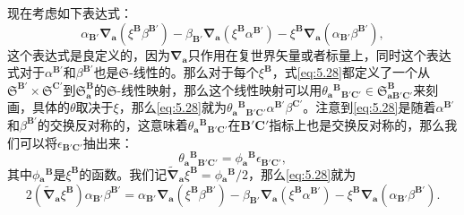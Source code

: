 现在考虑如下表达式：
\begin{equation}
	\alpha _{\boldsymbol{B} '}\boldsymbol{\nabla }_{\boldsymbol{a}} (\xi ^{\boldsymbol{B}} \beta ^{\boldsymbol{B} '} )-\beta _{\boldsymbol{B} '}\boldsymbol{\nabla }_{\boldsymbol{a}} (\xi ^{\boldsymbol{B}} \alpha ^{\boldsymbol{B} '} )-\xi ^{\boldsymbol{B}}\boldsymbol{\nabla }_{\boldsymbol{a}} (\alpha _{\boldsymbol{B} '} \beta ^{\boldsymbol{B} '} ),
	\label{eq:5.28}
\end{equation}
这个表达式是良定义的，因为$\boldsymbol{\nabla }_{\boldsymbol{a}}$只作用在复世界矢量或者标量上，同时这个表达式对于$\alpha ^{\boldsymbol{B} '}$和$\beta ^{\boldsymbol{B} '}$也是$\mathfrak{S}$-线性的。那么对于每个$\xi ^{\boldsymbol{B}}$，式\ref{eq:5.28}都定义了一个从$\mathfrak{S}^{\boldsymbol{B} '} \times \mathfrak{S}^{\boldsymbol{C} '}$到$\mathfrak{S}_{\boldsymbol{a}}^{\boldsymbol{B}}$的$\mathfrak{S}$-线性映射，那么这个线性映射可以用$\theta {_{\boldsymbol{a}}}^{\boldsymbol{B}}{}_{\boldsymbol{B} '\boldsymbol{C} '} \in \mathfrak{S}_{\boldsymbol{aB} '\boldsymbol{C} '}^{\boldsymbol{B}}$来刻画，具体的$\theta $取决于$\xi $，那么\ref{eq:5.28}就为$\theta {_{\boldsymbol{a}}}^{\boldsymbol{B}}{}_{\boldsymbol{B} '\boldsymbol{C} '} \alpha ^{\boldsymbol{B} '} \beta ^{\boldsymbol{C} '}$。注意到\ref{eq:5.28}是随着$\alpha ^{\boldsymbol{B} '}$和$\beta ^{\boldsymbol{B} '}$的交换反对称的，这意味着$\theta {_{\boldsymbol{a}}}^{\boldsymbol{B}}{}_{\boldsymbol{B} '\boldsymbol{C} '}$在$\boldsymbol{B} '\boldsymbol{C} '$指标上也是交换反对称的，那么我们可以将$\epsilon _{\boldsymbol{B} '\boldsymbol{C} '}$抽出来：
\begin{equation*}
	\theta {_{\boldsymbol{a}}}^{\boldsymbol{B}}{}_{\boldsymbol{B} '\boldsymbol{C} '} =\phi {_{\boldsymbol{a}}}^{\boldsymbol{B}} \epsilon _{\boldsymbol{B} '\boldsymbol{C} '} ,
\end{equation*}
其中$\phi {_{\boldsymbol{a}}}^{\boldsymbol{B}}$是$\xi ^{\boldsymbol{B}}$的函数。我们记$\tilde{\boldsymbol{\nabla }}_{\boldsymbol{a}} \xi ^{\boldsymbol{B}} =\phi {_{\boldsymbol{a}}}^{\boldsymbol{B}} /2$，那么\ref{eq:5.28}就为
\begin{equation}
	2(\tilde{\boldsymbol{\nabla }}_{\boldsymbol{a}} \xi ^{\boldsymbol{B}} )\alpha _{\boldsymbol{B} '} \beta ^{\boldsymbol{B} '} =\alpha _{\boldsymbol{B} '}\boldsymbol{\nabla }_{\boldsymbol{a}} (\xi ^{\boldsymbol{B}} \beta ^{\boldsymbol{B} '} )-\beta _{\boldsymbol{B} '}\boldsymbol{\nabla }_{\boldsymbol{a}} (\xi ^{\boldsymbol{B}} \alpha ^{\boldsymbol{B} '} )-\xi ^{\boldsymbol{B}}\boldsymbol{\nabla }_{\boldsymbol{a}} (\alpha _{\boldsymbol{B} '} \beta ^{\boldsymbol{B} '} ).
	\label{eq:5.29}
\end{equation}


